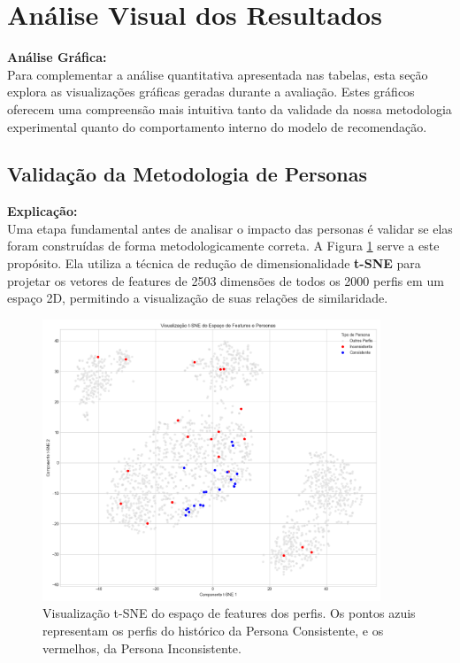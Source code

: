 \section{Análise Visual dos Resultados}
\label{sec:res_analise_visual}

\textbf{Análise Gráfica:} \\
Para complementar a análise quantitativa apresentada nas tabelas, esta seção explora as visualizações gráficas geradas durante a avaliação. Estes gráficos oferecem uma compreensão mais intuitiva tanto da validade da nossa metodologia experimental quanto do comportamento interno do modelo de recomendação.

\subsection{Validação da Metodologia de Personas}
\textbf{Explicação:} \\
Uma etapa fundamental antes de analisar o impacto das personas é validar se elas foram construídas de forma metodologicamente correta. A Figura \ref{fig:tsne_personas_tcc2} serve a este propósito. Ela utiliza a técnica de redução de dimensionalidade \textbf{t-SNE} para projetar os vetores de features de 2503 dimensões de todos os 2000 perfis em um espaço 2D, permitindo a visualização de suas relações de similaridade.

\begin{figure}[hbt]
    \centering
    \includegraphics[width=0.9\textwidth]{imagens/embedding_space_personas.png} %
    \caption{Visualização t-SNE do espaço de features dos perfis. Os pontos azuis representam os perfis do histórico da Persona Consistente, e os vermelhos, da Persona Inconsistente.}
    \label{fig:tsne_personas_tcc2}
\end{figure}

